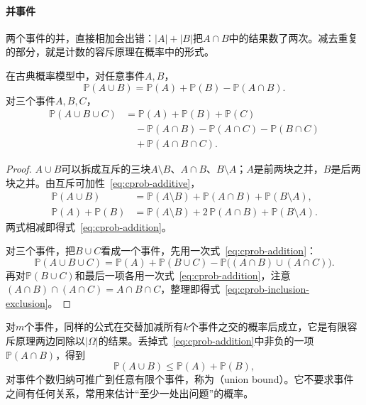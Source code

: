 \paragraph{并事件}
两个事件的并，直接相加会出错：$\lvert A\rvert+\lvert B\rvert$把$A\cap B$中的结果数了两次。减去重复的部分，就是计数的容斥原理在概率中的形式。

\begin{theorem}[加法公式]
\label{thm:cprob-addition}
在古典概率模型中，对任意事件$A,B$，
\begin{equation}
 \mathbb{P}(A\cup B)=\mathbb{P}(A)+\mathbb{P}(B)-\mathbb{P}(A\cap B).
 \label{eq:cprob-addition}
\end{equation}
对三个事件$A,B,C$，
\begin{equation}
 \begin{aligned}
 \mathbb{P}(A\cup B\cup C)
 &=\mathbb{P}(A)+\mathbb{P}(B)+\mathbb{P}(C)\\
 &\quad-\mathbb{P}(A\cap B)-\mathbb{P}(A\cap C)-\mathbb{P}(B\cap C)\\
 &\quad+\mathbb{P}(A\cap B\cap C).
 \end{aligned}
 \label{eq:cprob-inclusion-exclusion}
\end{equation}
\end{theorem}

\begin{proof}
$A\cup B$可以拆成互斥的三块$A\setminus B$、$A\cap B$、$B\setminus A$；$A$是前两块之并，$B$是后两块之并。由互斥可加性~\eqref{eq:cprob-additive}，
\[
 \begin{aligned}
 \mathbb{P}(A\cup B)&=\mathbb{P}(A\setminus B)+\mathbb{P}(A\cap B)+\mathbb{P}(B\setminus A),\\
 \mathbb{P}(A)+\mathbb{P}(B)&=\mathbb{P}(A\setminus B)+2\,\mathbb{P}(A\cap B)+\mathbb{P}(B\setminus A).
 \end{aligned}
\]
两式相减即得式~\eqref{eq:cprob-addition}。

对三个事件，把$B\cup C$看成一个事件，先用一次式~\eqref{eq:cprob-addition}：
\[
 \mathbb{P}(A\cup B\cup C)=\mathbb{P}(A)+\mathbb{P}(B\cup C)-\mathbb{P}\bigl((A\cap B)\cup(A\cap C)\bigr).
\]
再对$\mathbb{P}(B\cup C)$和最后一项各用一次式~\eqref{eq:cprob-addition}，注意$(A\cap B)\cap(A\cap C)=A\cap B\cap C$，整理即得式~\eqref{eq:cprob-inclusion-exclusion}。
\end{proof}

对$m$个事件，同样的公式在交替加减所有$k$个事件之交的概率后成立，它是有限容斥原理两边同除以$\lvert\Omega\rvert$的结果。丢掉式~\eqref{eq:cprob-addition}中非负的一项$\mathbb{P}(A\cap B)$，得到
\begin{equation}
 \mathbb{P}(A\cup B)\leq\mathbb{P}(A)+\mathbb{P}(B),
 \label{eq:cprob-union-bound}
\end{equation}
对事件个数归纳可推广到任意有限个事件，称为（union bound）。它不要求事件之间有任何关系，常用来估计“至少一处出问题”的概率。

